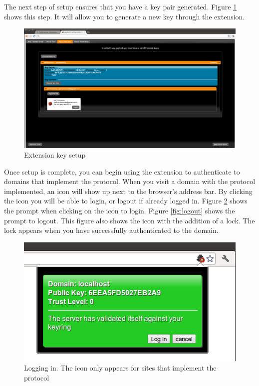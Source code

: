 \documentclass[11pt]{article}
\begin{document}
The next step of setup ensures that you have a key pair generated. Figure \ref{fig:keysetup} shows this step. It will allow you to generate a new key through the extension.\\
\begin{figure}[h!]
\centering
\includegraphics[scale=0.3]{ext_setup_keys}
\caption{Extension key setup}
\label{fig:keysetup}
\end{figure}

Once setup is complete, you can begin using the extension to authenticate to domains that implement the protocol. When you visit a domain with the protocol implemented, an icon will show up next to the browser's address bar. By clicking the icon you will be able to login, or logout if already logged in. Figure \ref{fig:login} shows the prompt when clicking on the icon to login. Figure \ref{fig:logout} shows the prompt to logout. This figure also shows the icon with the addition of a lock. The lock appears when you have successfully authenticated to the domain.\\
\begin{figure}[h!]
\centering
\includegraphics[scale=0.5]{ext_login}
\caption{Logging in. The icon only appears for sites that implement the protocol}
\label{fig:login}
\end{figure}
\end{document}
